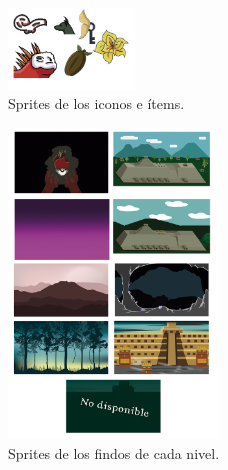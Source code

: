 \begin{figure}[H]
    \centering
    \includegraphics[width=0.30\textwidth]{Anexos/disenios/IconsItems.png}
    \caption{Sprites de los iconos e ítems.}
    \label{fig:backObjects}
\end{figure}

\begin{figure}[H]
    \centering
    \includegraphics[width=0.50\textwidth]{Anexos/disenios/Fondos.png}
    \caption{Sprites de los findos de cada nivel.}
    \label{fig:BG}
\end{figure}